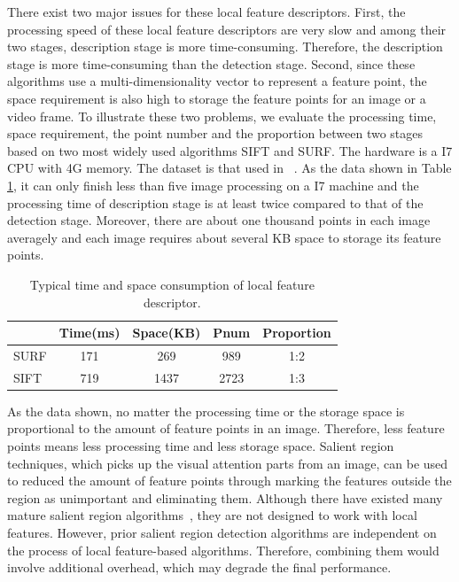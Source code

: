 There exist two major issues for these local feature descriptors. First, the processing speed of these local feature descriptors are very slow and among their two stages, description stage is more time-consuming. Therefore, the description stage is more time-consuming than the detection stage. Second, since these algorithms use a multi-dimensionality vector to represent a feature point, the space requirement is also high to storage the feature points for an image or a video frame. To illustrate these two problems, we evaluate the processing time, space requirement, the point number and the proportion between two stages based on two most widely used algorithms SIFT and SURF. The hardware is a I7 CPU with 4G memory. The dataset is that used in ~\cite{mikolajczyk2005performance}. As the data shown in Table \ref{tab:surfandsift}, it can only finish less than five image processing on a I7 machine and the processing time of description stage is at least twice compared to that of the detection stage. Moreover, there are about one thousand points in each image averagely and each image requires about several KB space to storage its feature points.

\begin{table}[!t]
\begin{center}
\begin{tabular}{|l|c|c|c|c|}
\hline
 & Time(ms) & Space(KB) & Pnum & Proportion \\
\hline
SURF & 171 & 269 & 989   &  1:2\\\hline
SIFT & 719 & 1437 & 2723 & 1:3 \\\hline
\end{tabular}
\end{center}
\caption{Typical time and space consumption of local feature descriptor.}
\label{tab:surfandsift}
\end{table}

As the data shown, no matter the processing time or the storage space is proportional to the amount of feature points in an image. Therefore, less feature points means  less processing time and less storage space. Salient region techniques, which picks up the visual attention parts from an image, can be used to reduced the amount of feature points through marking the features outside the region as unimportant and eliminating them. Although there have existed many mature salient region algorithms~\cite{cheng2011global,achanta2009frequency,itti1998model}, they are not designed to work with local features. However, prior salient region detection algorithms are independent on the process of local feature-based algorithms. Therefore,  combining them would involve additional overhead, which may degrade the final performance.

